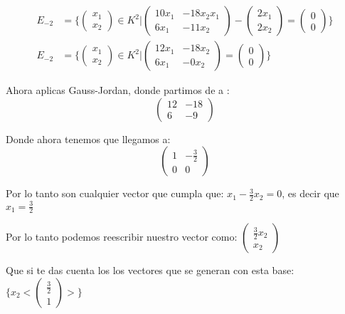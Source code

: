 \documentclass[12pt]{report}                                    %
\begin{document}
\begin{equation*}
\begin{split}
                E_{-2} &= \{ \begin{pmatrix}x_1\\x_2\end{pmatrix} \in K^2 |
                \begin{pmatrix}10x_1&-18x_2x_1\\6x_1&-11x_2\end{pmatrix}  - \begin{pmatrix}2x_1\\2x_2\end{pmatrix} 
                = \begin{pmatrix}0\\0\end{pmatrix} \} \\
                E_{-2} &= \{ \begin{pmatrix}x_1\\x_2\end{pmatrix} \in K^2 |
                \begin{pmatrix}12x_1&-18x_2\\6x_1&-0x_2\end{pmatrix}
                = \begin{pmatrix}0\\0\end{pmatrix} \}
            \end{split}
            \end{equation*}


            Ahora aplicas Gauss-Jordan, donde partimos de a :
            $$\begin{pmatrix}12 & -18 \\6 & -9\end{pmatrix}$$

            Donde ahora tenemos que llegamos a:
            $$\begin{pmatrix}1 & -\frac{3}{2} \\ 0 & 0\end{pmatrix}$$

            Por lo tanto son cualquier vector que cumpla que:
            $x_1 -\frac{3}{2}x_2 = 0$, es decir que $x_1 = \frac{3}{2}$
            
            Por lo tanto podemos reescribir nuestro vector como:
            $\begin{pmatrix} \frac{3}{2}x_2 \\ x_2\end{pmatrix}$

            Que si te das cuenta los los vectores que se generan con esta base:
            $ \{ x_2 <\begin{pmatrix}\frac{3}{2} \\ 1\end{pmatrix}> \}$
            
\end{document}
